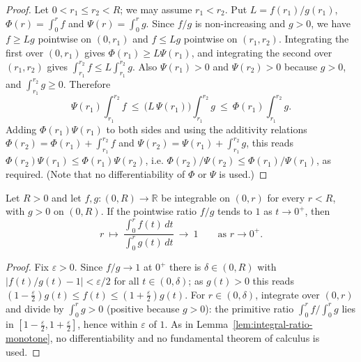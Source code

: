\begin{proof}
\sketch

Let $0<r_1\le r_2<R$; we may assume $r_1<r_2$. Put $L=f(r_1)/g(r_1)$,
$\Phi(r)=\int_0^rf$ and $\Psi(r)=\int_0^rg$. Since $f/g$ is non-increasing and
$g>0$, we have $f\ge Lg$ pointwise on $(0,r_1)$ and $f\le Lg$ pointwise on
$(r_1,r_2)$. Integrating the first over $(0,r_1)$ gives $\Phi(r_1)\ge L\Psi(r_1)$,
and integrating the second over $(r_1,r_2)$ gives
$\int_{r_1}^{r_2}f\le L\int_{r_1}^{r_2}g$. Also $\Psi(r_1)>0$ and
$\Psi(r_2)>0$ because $g>0$, and $\int_{r_1}^{r_2}g\ge0$. Therefore
$$\Psi(r_1)\int_{r_1}^{r_2}f\ \le\ \bigl(L\,\Psi(r_1)\bigr)\int_{r_1}^{r_2}g
\ \le\ \Phi(r_1)\int_{r_1}^{r_2}g .$$
Adding $\Phi(r_1)\Psi(r_1)$ to both sides and using the additivity relations
$\Phi(r_2)=\Phi(r_1)+\int_{r_1}^{r_2}f$ and
$\Psi(r_2)=\Psi(r_1)+\int_{r_1}^{r_2}g$, this reads
$\Phi(r_2)\Psi(r_1)\le\Phi(r_1)\Psi(r_2)$, i.e.
$\Phi(r_2)/\Psi(r_2)\le\Phi(r_1)/\Psi(r_1)$, as required. (Note that no
differentiability of $\Phi$ or $\Psi$ is used.)
\end{proof}

\begin{lemma}
\label{lem:integral-ratio-normalized}




Let $R>0$ and let $f,g\colon(0,R)\to\mathbb R$ be integrable on $(0,r)$ for
every $r<R$, with $g>0$ on $(0,R)$. If the pointwise ratio $f/g$ tends to $1$
as $t\to0^+$, then
$$r\ \longmapsto\ \frac{\int_0^rf(t)\,dt}{\int_0^rg(t)\,dt}\ \longrightarrow\ 1
\qquad\text{as }r\to0^+.$$
\end{lemma}

\begin{proof}
\sketch

Fix $\varepsilon>0$. Since $f/g\to1$ at $0^+$ there is $\delta\in(0,R)$ with
$|f(t)/g(t)-1|<\varepsilon/2$ for all $t\in(0,\delta)$; as $g(t)>0$ this reads
$(1-\tfrac\varepsilon2)g(t)\le f(t)\le(1+\tfrac\varepsilon2)g(t)$. For
$r\in(0,\delta)$, integrate over $(0,r)$ and divide by $\int_0^rg>0$ (positive
because $g>0$): the primitive ratio $\int_0^rf/\int_0^rg$ lies in
$[1-\tfrac\varepsilon2,1+\tfrac\varepsilon2]$, hence within $\varepsilon$ of $1$.
As in Lemma~\ref{lem:integral-ratio-monotone}, no differentiability and no
fundamental theorem of calculus is used.
\end{proof}

